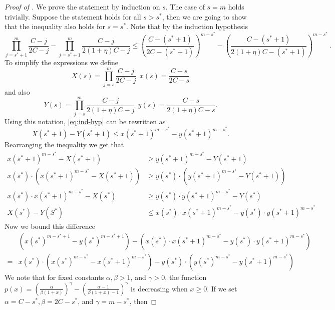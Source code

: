 \begin{proof}[Proof of ]
    We prove the statement by induction on $s$. The case of $s = m$ holds trivially. Suppose the statement holds for all $s>s^*$,  then we are going to show that the inequality also holds for $s = s^*$.
    Note that by the induction hypothesis
     \begin{equation}\label{eq:ind-hyp}
     \prod_{j=s^*+1}^{m}\frac{C-j}{2C-j} - \prod_{j=s^*+1}^{m}\frac{C-j}{2(1+\eta)C-j} \le \left(\frac{C-(s^*+1)}{2C-(s^*+1)}\right)^{m-s^*} - \left(\frac{C-(s^*+1)}{2(1+\eta)C-(s^*+1)}\right)^{m-s^*}~.
     \end{equation}
     To simplify the expressions we define
     \[X(s) = \prod_{j=s}^{m}\frac{C-j}{2C-j}~~x(s) = \frac{C-s}{2C-s}\]
     and also 
     \[Y(s) = \prod_{j=s}^{m}\frac{C-j}{2(1+\eta)C-j}~~y(s) = \frac{C-s}{2(1+\eta)C-s}.\]
     Using this notation, \eqref{eq:ind-hyp} can be rewritten as 
     \begin{equation*}
         X(s^*+1) - Y(s^*+1) \le x(s^*+1)^{m-s^*} - y(s^*+1)^{m-s^*}.
     \end{equation*}
     Rearranging the inequality we get that
     \begin{align}
         x(s^*+1)^{m-s^*} - X(s^*+1) &\ge y(s^*+1)^{m-s^*} - Y(s^*+1) \nonumber\\
         x(s^*)\cdot(x(s^*+1)^{m-s^*} - X(s^*+1)) &\ge y(s^*)\cdot(y(s^*+1)^{m-s^1} - Y(s^*+1)) \nonumber\\
          x(s^*)\cdot x(s^*+1)^{m-s^*} - X(s^*) &\ge y(s^*)\cdot y(s^*+1)^{m-s^*}- Y(s^*) \nonumber\\
          X(s^*) - Y(S^*) &\le x(s^*)\cdot x(s^*+1)^{m-s^*}  - y(s^*)\cdot y(s^*+1)^{m-s^*} \label{eq:X-Y-bound}
     \end{align}
     Now we bound this difference
     \begin{align}
         &\left(x(s^*)^{m-s^*+1} - y(s^*)^{m-s^*+1}\right) - \left(x(s^*)\cdot x(s^*+1)^{m-s^*}  - y(s^*)\cdot y(s^*+1)^{m-s^*}\right) \nonumber\\
        = & x(s^*)\cdot \left(x(s^*)^{m-s^*} - x(s^*+1)^{m-s^*}\right) - y(s^*) \cdot \left(y(s^*)^{m-s^*} - y(s^*+1)^{m-s^*}\right) \label{eq:x-y-bound}
     \end{align}
     We note that for fixed constants $\alpha, \beta > 1 $, and $\gamma > 0$, the function $p(x) = \left(\frac{\alpha}{\beta(1+x)}\right)^\gamma - \left(\frac{\alpha-1}{\beta(1+x)-1}\right)^\gamma$ is decreasing when $ x\ge 0$. If we set $\alpha = C-s^*, \beta = 2C-s^*$, and $\gamma = m-s^*$, then 

\end{proof}
